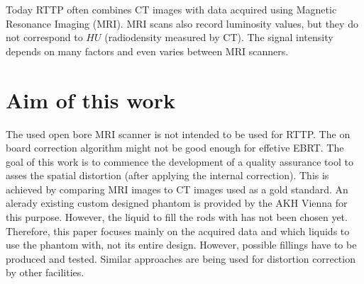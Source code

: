 Today RTTP often combines CT images with data acquired using Magnetic Resonance Imaging (MRI).
MRI scans also record luminosity values, but they do not correspond to $HU$ (radiodensity measured by CT).
The signal intensity depends on many factors and even varies between MRI scanners.



\section{Aim of this work}
The used open bore MRI scanner is not intended to be used for RTTP. The on board correction algorithm might not be good enough for effetive EBRT.
The goal of this work is to commence the development of a quality assurance tool to asses the spatial distortion (after applying the internal correction).
This is achieved by comparing MRI images to CT images used as a gold standard.
An alerady existing custom designed phantom is provided by the AKH Vienna for this purpose.
However, the liquid to fill the rods with has not been chosen yet.
Therefore, this paper focuses mainly on the acquired data and which liquids to use the phantom with, not its entire design.
However, possible fillings have to be produced and tested.
Similar approaches are being used for distortion correction by other facilities. \cite{Price2015, Petersch2004, Torfeh2015, Wang2004, Wang2004b, Mizowaki2000}




\newpage